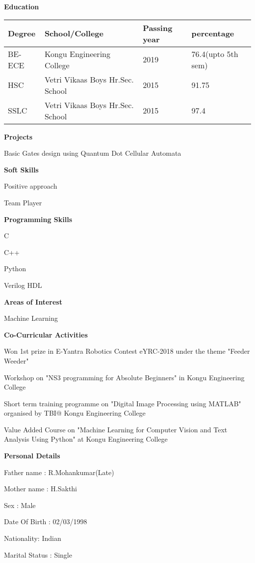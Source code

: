 \documentclass[a4paper,12pt,final]{memoir}
\newcommand{\Sep}{\vspace{1.5em}}
\newcommand{\SmallSep}{\vspace{0.5em}}
\newcommand{\CVSection}[1]
	{\Large\textbf{#1}\par
	\SmallSep\normalsize\normalfont}
\begin{document}
\CVSection{Education}
\begin{tabular}{ | l | l | l | l |}
    \hline
     Degree & School/College & Passing year & percentage\\
     \hline
     BE-ECE & Kongu Engineering College & 2019 & 76.4(upto 5th sem)\\
     \hline
     HSC & Vetri Vikaas Boys Hr.Sec. School & 2015 & 91.75\\
     \hline
     SSLC & Vetri Vikaas Boys Hr.Sec. School & 2015 & 97.4\\
     \hline
     
\end{tabular}
\Sep
\CVSection{Projects}
\begin{compactitem}[\color{RoyalBlue}$\circ$]
\item Basic Gates design using Quantum Dot Cellular Automata


\Sep 
\CVSection{Soft Skills}

\item Positive approach
\item Team Player
\Sep

\CVSection{Programming Skills}
\item C
\item C++
\item Python
\item Verilog HDL

\Sep
\CVSection{Areas of Interest}
\item Machine Learning
\Sep

\CVSection{Co-Curricular Activities}
\item Won 1st prize in E-Yantra Robotics Contest eYRC-2018 under the theme "Feeder Weeder"
\item Workshop on "NS3 programming for Absolute Beginners" in Kongu Engineering College
\item Short term training programme on "Digital Image Processing using MATLAB" organised by TBI@ Kongu Engineering College
\item Value Added Course on "Machine Learning for Computer Vision and Text Analysis Using Python" at Kongu Engineering College
\Sep
\clearpage
\framebreak
\framebreak

\Sep
\CVSection{Personal Details}
\item Father name : R.Mohankumar(Late)
\item Mother name : H.Sakthi
\item Sex : Male
\item Date Of Birth : 02/03/1998
\item Nationality: Indian
\item Marital Status : Single


\end{compactitem}
\end{document}
